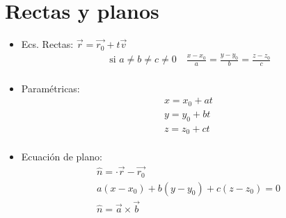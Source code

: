 \section{Rectas y planos}
\begin{itemize}
    \item Ecs. Rectas: $\vec{r}= \vec{r_0} + t \vec{v}$ 
        \begin{align*}
            \text{  si  } a \neq b \neq c \neq 0    \quad \frac{x-x_0}{a} = \frac{y-y_0}{b} = \frac{z-z_0}{c}  \\ 
        \end{align*}
    
    \item Paramétricas:
        \begin{align*}
            x = x_0 +at \\ 
            y = y_0 +bt \\ 
            z = z_0 +ct \\ 
        \end{align*}
    
    \item Ecuación de plano:
        \begin{align*}
            \hat{n} = \cdot \vec{r}-\vec{r_0} \\ 
            a(x-x_0)+b(y-y_0) + c(z-z_0) = 0 \\ 
            \hat{n}= \vec{a} \times  \vec{b} \\ 
        \end{align*}
\end{itemize}


